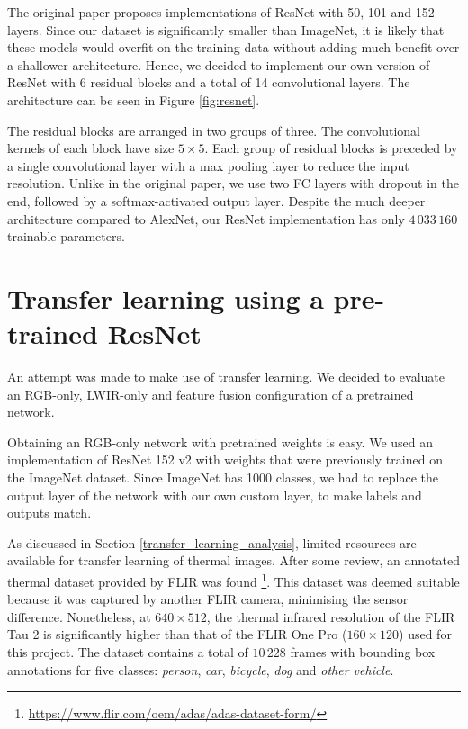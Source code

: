 \documentclass{l4proj}
\begin{document}
The original paper proposes implementations of ResNet with 50, 101 and 152 layers. Since our dataset is significantly smaller than ImageNet, it is likely that these models would overfit on the training data without adding much benefit over a shallower architecture. Hence, we decided to implement our own version of ResNet with 6 residual blocks and a total of 14 convolutional layers. The architecture can be seen in Figure \ref{fig:resnet}.

The residual blocks are arranged in two groups of three. The convolutional kernels of each block have size $5 \times 5$. Each group of residual blocks is preceded by a single convolutional layer with a max pooling layer to reduce the input resolution. Unlike in the original paper, we use two FC layers with dropout in the end, followed by a softmax-activated output layer. Despite the much deeper architecture compared to AlexNet, our ResNet implementation has only $4\,033\,160$ trainable parameters.



\section{Transfer learning using a pre-trained ResNet}
\label{transfer_learning}

An attempt was made to make use of transfer learning. We decided to evaluate an RGB-only, LWIR-only and feature fusion configuration of a pretrained network. 

Obtaining an RGB-only network with pretrained weights is easy. We used an implementation of ResNet 152 v2 \citep{he_identity_2016} with weights that were previously trained on the ImageNet dataset. Since ImageNet has 1000 classes, we had to replace the output layer of the network with our own custom layer, to make labels and outputs match.

As discussed in Section \ref{transfer_learning_analysis}, limited resources are available for transfer learning of thermal images. After some review, an annotated thermal dataset provided by FLIR was found \footnote{\url{https://www.flir.com/oem/adas/adas-dataset-form/}}. This dataset was deemed suitable because it was captured by another FLIR camera, minimising the sensor difference. Nonetheless, at $640 \times 512$, the thermal infrared resolution of the FLIR Tau 2 is significantly higher than that of the FLIR One Pro ($160 \times 120$) used for this project. The dataset contains a total of $10\,228$ frames with bounding box annotations for five classes: \textit{person}, \textit{car}, \textit{bicycle}, \textit{dog} and \textit{other vehicle}.
\end{document}
